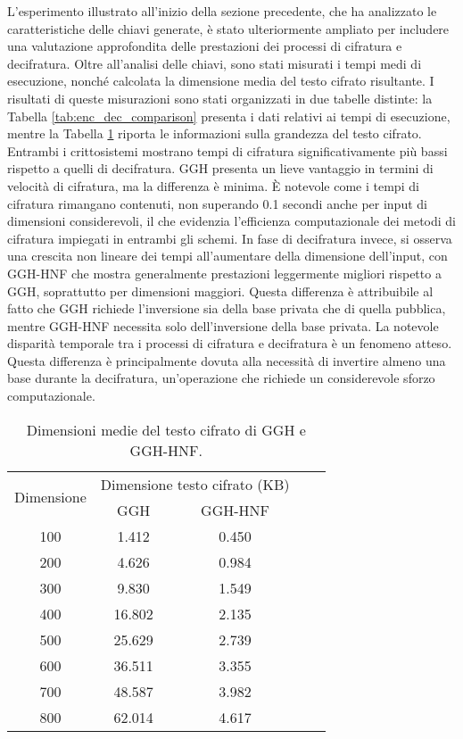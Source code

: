 L'esperimento illustrato all'inizio della sezione precedente, che ha analizzato le 
caratteristiche delle chiavi generate, è stato ulteriormente ampliato per includere una 
valutazione approfondita delle prestazioni dei processi di cifratura e decifratura. 
Oltre all'analisi delle chiavi, sono stati misurati i tempi medi di esecuzione, 
nonché calcolata la dimensione media del testo cifrato risultante. 
I risultati di queste misurazioni sono stati organizzati in due 
tabelle distinte: la Tabella \ref{tab:enc_dec_comparison} presenta i dati relativi ai 
tempi di esecuzione, mentre la Tabella \ref{tab:ciphertext_size_comparison} riporta le 
informazioni sulla grandezza del testo cifrato. 
Entrambi i crittosistemi mostrano tempi di cifratura significativamente più bassi rispetto
a quelli di decifratura. GGH presenta un lieve vantaggio in termini di velocità di 
cifratura, ma la differenza è minima. È notevole come i tempi di cifratura rimangano 
contenuti, non superando 0.1 secondi anche per input di dimensioni considerevoli, il 
che evidenzia l'efficienza computazionale dei metodi di cifratura impiegati in entrambi gli schemi.
In fase di decifratura invece, si osserva una crescita non lineare dei tempi all'aumentare 
della dimensione dell'input, con GGH-HNF che mostra generalmente prestazioni leggermente 
migliori rispetto a GGH, soprattutto per dimensioni maggiori. 
Questa differenza è attribuibile al fatto che GGH richiede l'inversione sia della base privata 
che di quella pubblica, mentre GGH-HNF necessita solo dell'inversione della base privata.
La notevole disparità temporale tra i processi di cifratura e decifratura è un fenomeno atteso. 
Questa differenza è principalmente dovuta alla necessità di invertire almeno una base durante 
la decifratura, un'operazione che richiede un considerevole sforzo computazionale. 

\begin{table}[htbp]
    \centering
    \begin{tabular}{|c|c|c|c|c|}
        \hline
        \multirow{2}{*}{Dimensione} & 
        \multicolumn{2}{c|}{Dimensione testo cifrato (KB)} \\
        \cline{2-3}
        & GGH & GGH-HNF\\
        \hline
        100 & 1.412  & 0.450  \\ 
        200 & 4.626  & 0.984  \\
        300 & 9.830  & 1.549  \\
        400 & 16.802 & 2.135 \\
        500 & 25.629 & 2.739  \\
        600 & 36.511 & 3.355  \\
        700 & 48.587 & 3.982  \\
        800 & 62.014 & 4.617  \\
        \hline
    \end{tabular}
    \caption{Dimensioni medie del testo cifrato di GGH e GGH-HNF.}
    \label{tab:ciphertext_size_comparison}
\end{table}

